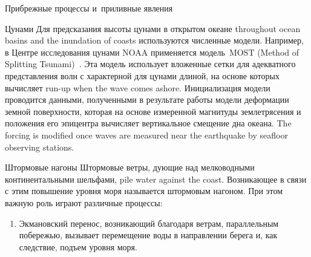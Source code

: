 \begin{chapter}{Прибрежные процессы и~приливные явления}
\begin{section}{Цунами}
Для предсказания высоты цунами в открытом океане 
throughout ocean basins and the inundation of coasts
используются численные модели. Например, в Центре исследования цунами
NOAA применяется модель~MOST (Method of Splitting Tsunami)~\cite{Titov:1997}. 
Эта модель использует вложенные сетки для адекватного представления 
волн с характерной для цунами длиной, на основе которых вычисляет
run-up when the wave comes ashore. Инициализация модели проводится данными,
полученными в результате работы модели деформации земной поверхности,
которая на основе измеренной магнитуды землетрясения и положения его 
эпицентра вычисляет вертикальное смещение дна океана.
The forcing is modified once waves are
measured near the earthquake by seafloor observing stations.
%
\end{section}

\begin{section}{Штормовые нагоны}
Штормовые ветры, дующие над мелководными
континентальными шельфами, pile water against the coast. 
Возникающее в связи с этим повышение уровня моря называется штормовым нагоном.
При этом важную роль играют различные процессы:
%
%
\begin{enumerate}
\item 
Экмановский перенос, возникающий благодаря
ветрам, параллельным побережью, вызывает перемещение воды в направлении
берега и, как следствие, подъем уровня моря.
%


\end{enumerate}
\end{section}
\end{chapter}
